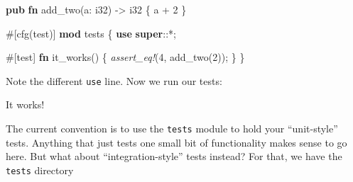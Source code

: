 \documentclass[a4paper,]{book}
\newenvironment{Shaded}{\begin{snugshade}}{\end{snugshade}}
\newcommand{\KeywordTok}[1]{\textcolor[rgb]{0.13,0.29,0.53}{\textbf{{#1}}}}
\newcommand{\DataTypeTok}[1]{\textcolor[rgb]{0.13,0.29,0.53}{{#1}}}
\newcommand{\DecValTok}[1]{\textcolor[rgb]{0.00,0.00,0.81}{{#1}}}
\newcommand{\PreprocessorTok}[1]{\textcolor[rgb]{0.56,0.35,0.01}{\textit{{#1}}}}
\newcommand{\AttributeTok}[1]{\textcolor[rgb]{0.77,0.63,0.00}{{#1}}}
\newcommand{\NormalTok}[1]{{#1}}
\begin{document}
\begin{Shaded}
\begin{Highlighting}[]
\KeywordTok{pub} \KeywordTok{fn} \NormalTok{add_two(a: }\DataTypeTok{i32}\NormalTok{) -> }\DataTypeTok{i32} \NormalTok{\{}
    \NormalTok{a + }\DecValTok{2}
\NormalTok{\}}

\AttributeTok{#[}\NormalTok{cfg}\AttributeTok{(}\NormalTok{test}\AttributeTok{)]}
\KeywordTok{mod} \NormalTok{tests \{}
    \KeywordTok{use} \KeywordTok{super}\NormalTok{::*;}

    \AttributeTok{#[}\NormalTok{test}\AttributeTok{]}
    \KeywordTok{fn} \NormalTok{it_works() \{}
        \PreprocessorTok{assert_eq!}\NormalTok{(}\DecValTok{4}\NormalTok{, add_two(}\DecValTok{2}\NormalTok{));}
    \NormalTok{\}}
\NormalTok{\}}
\end{Highlighting}
\end{Shaded}

Note the different \texttt{use} line. Now we run our tests:

\begin{Shaded}
\end{Shaded}

It works!

The current convention is to use the \texttt{tests} module to hold your
``unit-style'' tests. Anything that just tests one small bit of
functionality makes sense to go here. But what about
``integration-style'' tests instead? For that, we have the
\texttt{tests} directory
\end{document}
